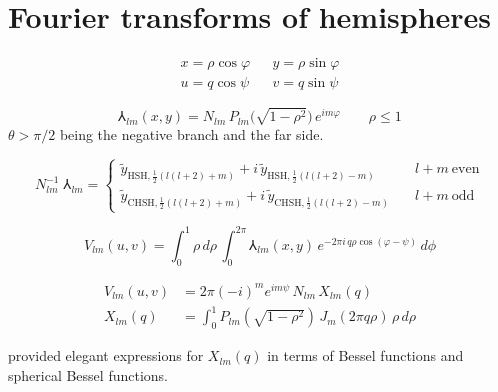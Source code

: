 \section{Fourier transforms of hemispheres}

\begin{equation}
\begin{matrix}
  x = \rho\cos\varphi & & y = \rho\sin\varphi \\
  u = q\cos\psi       & & v = q\sin\psi
\end{matrix}
\end{equation}

\begin{equation}
  \Yup_{lm}(x,y) = N_{lm}\,P_{lm}\bigl(\sqrt{1-\rho^{2}}\bigr)\,e^{im\varphi}
  \qquad \rho \le 1
  \label{eq:disk-harmonic}
\end{equation}
$\theta > \pi/2$ being the negative branch and the far side.

\begin{equation}
  N_{lm}^{-1}\;\Yup_{lm} =
  \begin{cases}
    \tilde y_{\mathrm{HSH},{\scriptscriptstyle\frac{1}{2}}(l(l+2)+m)}
      + i\,\tilde y_{\mathrm{HSH},{\scriptscriptstyle\frac{1}{2}}(l(l+2)-m)}
      & \quad l+m\ \text{even}  \\[8pt]
    \tilde y_{\mathrm{CHSH},{\scriptscriptstyle\frac{1}{2}}(l(l+2)+m)}
      + i\,\tilde y_{\mathrm{CHSH},{\scriptscriptstyle\frac{1}{2}}(l(l+2)-m)}
      & \quad l+m\ \text{odd}
  \end{cases}
  \label{eq:disk-basis-hsh}
\end{equation}

\begin{equation}
  V_{lm}(u,v) = \int_0^1 \rho\,d\rho\, \int_0^{2\pi} \Yup_{lm}(x,y) \,
                            e^{-2\pi i \, q\rho \cos(\varphi - \psi)} \, d\phi
\end{equation}


\begin{equation}
\begin{aligned}
  V_{lm}(u,v) &= 2\pi(-i)^m e^{im\psi}\, N_{lm} \, X_{lm}(q) \\
  X_{lm}(q) &= \int_0^1 P_{lm}\!\left(\sqrt{1-\rho^2}\right) \,
                        J_m(2\pi q\rho)\,\rho\,d\rho
\end{aligned}
\end{equation}

\cite{2026PASP..138e4504D} provided elegant expressions for $X_{lm}(q)$
in terms of Bessel functions and spherical Bessel functions.

